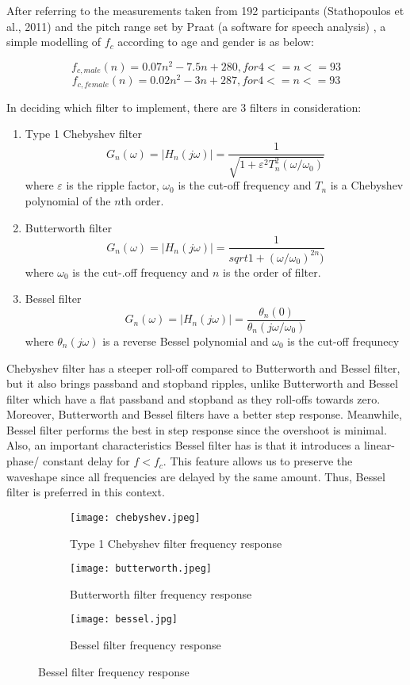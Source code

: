 After referring to the measurements taken from 192 participants (Stathopoulos et al., 2011) and the pitch range
set by Praat (a software for speech analysis) \cite{praat}, a simple modelling of $f_c$ according to age and gender
is as below:

\[f_{c,male}(n) = 0.07n^2 - 7.5n + 280, for  4 <= n <= 93\]
\[f_{c,female}(n) = 0.02n^2 - 3n + 287, for  4 <= n <= 93\]

In deciding which filter to implement, there are 3 filters in consideration:
\begin{enumerate}[label=(\alph*)]
	\item Type 1 Chebyshev filter
	\[G_{n}(\omega) = |H_{n}(j\omega)| = {\frac{1}{\sqrt{1+\varepsilon^{2} T_{n}^{2}(\omega/\omega_{0})}}}\]
	where $\varepsilon$  is the ripple factor, $\omega _{0}$ is the cut-off frequency
	and $T_{n}$ is a Chebyshev polynomial of the $n$th order.
	\item Butterworth filter
	\[G_{n}(\omega) = |H_{n}(j\omega)| = {\frac{1}{sqrt{1+(\omega/\omega_{0})^{2n})}}}\]
	where $\omega _{0}$ is the cut-.off frequency and $n$ is the order of filter.
	\item Bessel filter
	\[G_{n}(\omega) = |H_{n}(j\omega)| ={\frac {\theta _{n}(0)}{\theta _{n}(j\omega/\omega _{0})}}\]
	where $\theta _{n}(j\omega)$ is a reverse Bessel polynomial and $\omega _{0}$ is the cut-off frequnecy
\end{enumerate}

Chebyshev filter has a steeper roll-off compared to Butterworth and Bessel filter, but it also brings passband and stopband ripples, 
unlike Butterworth and Bessel filter which have a flat passband and stopband as they roll-offs towards zero. Moreover, Butterworth 
and Bessel filters have a better step response. Meanwhile, Bessel filter performs the best in step response since the overshoot is
minimal. Also, an important characteristics Bessel filter has is that it introduces a linear-phase/ constant delay for $f<f_c$. This
feature allows us to preserve the waveshape since all frequencies are delayed by the same amount.
Thus, Bessel filter is preferred in this context.

\begin{figure}[h]
	\centering
	\begin{subfigure}{.32\textwidth}
	  	\centering
	  	\texttt{[image: chebyshev.jpeg]}
	  	\caption{Type 1 Chebyshev filter frequency response}
	  	\label{fig:sub1}
	\end{subfigure}%
	\begin{subfigure}{.32\textwidth}
	  	\centering
	  	\texttt{[image: butterworth.jpeg]}
	  	\caption{Butterworth filter frequency response}
	  	\label{fig:sub2}
	\end{subfigure}
	\begin{subfigure}{.32\textwidth}
		\centering
		\texttt{[image: bessel.jpg]}
		\caption{Bessel filter frequency response \cite{bessel}}
		\label{fig:sub3}
	\end{subfigure}
\end{figure}


